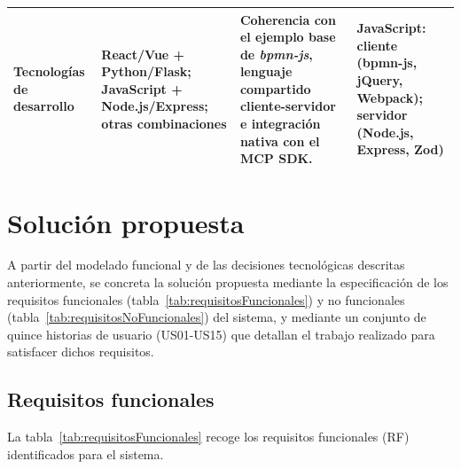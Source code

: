 {\begin{table}[htbp]
\begin{tabularx}{\textwidth}{|p{3.1cm}|X|X|p{3.1cm}|}
Tecnologías de desarrollo &
React/Vue + Python/Flask; JavaScript + Node.js/Express; otras combinaciones &
Coherencia con el ejemplo base de \textit{bpmn-js}, lenguaje compartido cliente-servidor e integración nativa con el MCP SDK. &
\textbf{JavaScript}: cliente (bpmn-js, jQuery, Webpack); servidor (Node.js, Express, Zod) \\
\hline

\end{tabularx}
\end{table}


\section{Solución propuesta}
\label{sec:solucionPropuesta}

A partir del modelado funcional y de las decisiones tecnológicas descritas anteriormente, se concreta la solución propuesta mediante la especificación de los requisitos funcionales (tabla~\ref{tab:requisitosFuncionales}) y no funcionales (tabla~\ref{tab:requisitosNoFuncionales}) del sistema, y mediante un conjunto de quince historias de usuario (US01-US15) que detallan el trabajo realizado para satisfacer dichos requisitos.

\subsection{Requisitos funcionales}
\label{subsec:requisitosFuncionales}

La tabla~\ref{tab:requisitosFuncionales} recoge los requisitos funcionales (RF) identificados para el sistema.

}
